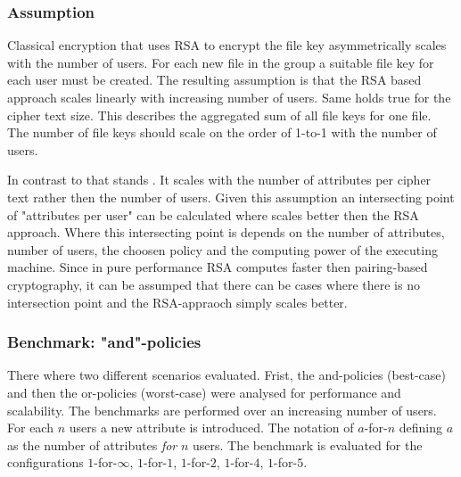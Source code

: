 \subsubsection{Assumption}
Classical encryption that uses RSA to encrypt the file key asymmetrically scales with the number of users. For each new file in the group a suitable file key for each user must be created. The resulting assumption is that the RSA based approach scales linearly with increasing number of users. Same holds true for the cipher text size. This describes the aggregated sum of all file keys for one file. The number of file keys should scale on the order of 1-to-1 with the number of users. 

In contrast to that stands \name. It scales with the number of attributes per cipher text rather then the number of users. Given this assumption an intersecting point of "attributes per user" can be calculated where \name scales better then the RSA approach. Where this intersecting point is depends on the number of attributes, number of users, the choosen policy and the computing power of the executing machine. Since in pure performance RSA computes faster then pairing-based cryptography, it can be assumped that there can be cases where there is no intersection point and the RSA-appraoch simply scales better. 

\subsubsection{Benchmark: "and"-policies}
There where two different scenarios evaluated. Frist, the and-policies (best-case) and then the or-policies (worst-case) were analysed for performance and scalability. The benchmarks are performed over an increasing number of users. For each $n$ users a new attribute is introduced. The notation of $a$-for-$n$ defining $a$ as the number of attributes \textit{for} $n$ users. The benchmark is evaluated for the configurations $1$-for-$\infty$, $1$-for-$1$, $1$-for-$2$, $1$-for-$4$, $1$-for-$5$.

